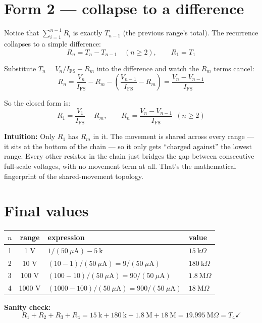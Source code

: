 \documentclass[11pt,a4paper]{article}
\newcommand{\intuition}[1]{\par\textcolor{intuition}{\textbf{Intuition:}} #1}
\begin{document}
\section*{Form 2 --- collapse to a difference}

Notice that $\displaystyle\sum_{i=1}^{n-1} R_i$ is exactly $T_{n-1}$ (the previous range's total). The recurrence collapses to a simple difference:
\[
\boxed{\;R_n = T_n - T_{n-1} \quad (n \geq 2), \qquad R_1 = T_1\;}
\]

Substitute $T_n = V_n / I_{\text{FS}} - R_m$ into the difference and watch the $R_m$ terms cancel:
\[
R_n = \frac{V_n}{I_{\text{FS}}} - R_m - \left(\frac{V_{n-1}}{I_{\text{FS}}} - R_m\right) = \frac{V_n - V_{n-1}}{I_{\text{FS}}}
\]

So the closed form is:
\[
\boxed{\;R_1 = \dfrac{V_1}{I_{\text{FS}}} - R_m, \qquad R_n = \dfrac{V_n - V_{n-1}}{I_{\text{FS}}}\ \ (n \geq 2)\;}
\]

\intuition{Only $R_1$ has $R_m$ in it. The movement is shared across every range --- it sits at the bottom of the chain --- so it only gets ``charged against'' the lowest range. Every other resistor in the chain just bridges the gap between consecutive full-scale voltages, with no movement term at all. That's the mathematical fingerprint of the shared-movement topology.}

\section*{Final values}

\begin{center}
\begin{tabular}{ccll}
\toprule
$n$ & range & expression & value \\
\midrule
1 & 1 V    & $1/(50\ \mu\text{A}) - 5\ \text{k}$    & $15\ \text{k}\Omega$ \\
2 & 10 V   & $(10-1)/(50\ \mu\text{A}) = 9/(50\ \mu\text{A})$    & $180\ \text{k}\Omega$ \\
3 & 100 V  & $(100-10)/(50\ \mu\text{A}) = 90/(50\ \mu\text{A})$  & $1.8\ \text{M}\Omega$ \\
4 & 1000 V & $(1000-100)/(50\ \mu\text{A}) = 900/(50\ \mu\text{A})$ & $18\ \text{M}\Omega$ \\
\bottomrule
\end{tabular}
\end{center}

\textbf{Sanity check:}
\[
R_1 + R_2 + R_3 + R_4 = 15\ \text{k} + 180\ \text{k} + 1.8\ \text{M} + 18\ \text{M} = 19.995\ \text{M}\Omega = T_4 \checkmark
\]
\end{document}

